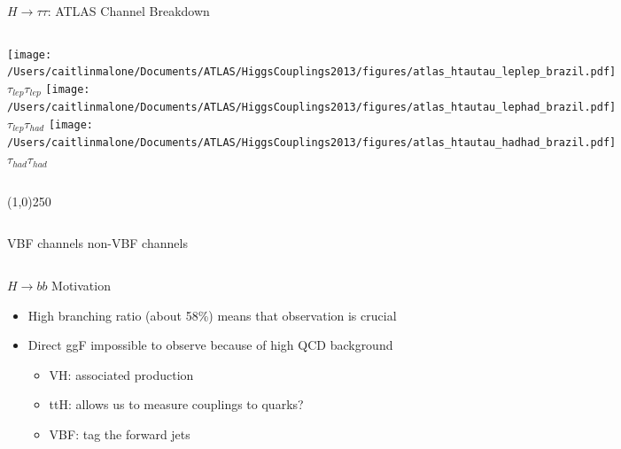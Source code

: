 \documentclass{beamer}
\begin{document}
\begin{frame}{$H\rightarrow\tau\tau$: ATLAS Channel Breakdown}
	\begin{columns}[c]
			\texttt{[image: /Users/caitlinmalone/Documents/ATLAS/HiggsCouplings2013/figures/atlas\_htautau\_leplep\_brazil.pdf]}\\
			\scriptsize\center \vspace{-0.5cm}
			$\tau_{lep}\tau_{lep}$
			\texttt{[image: /Users/caitlinmalone/Documents/ATLAS/HiggsCouplings2013/figures/atlas\_htautau\_lephad\_brazil.pdf]} 
			\scriptsize\center \vspace{-0.5cm}
			$\tau_{lep}\tau_{had}$
			\texttt{[image: /Users/caitlinmalone/Documents/ATLAS/HiggsCouplings2013/figures/atlas\_htautau\_hadhad\_brazil.pdf]} 
			\scriptsize \center \vspace{-0.5cm}
			$\tau_{had}\tau_{had}$
	\end{columns}
	
	\begin{center}
	\line(1,0){250}
	\end{center}
	
	\begin{columns}[c]
			\scriptsize \center \vspace{-0.5cm}
			VBF channels
			\scriptsize \center \vspace{-0.5cm}
			non-VBF channels
	\end{columns}

\end{frame}



\begin{frame}{$H\rightarrow bb$ Motivation}
	\begin{itemize}
		\item High branching ratio (about 58\%) means that observation is crucial 
		\item Direct ggF impossible to observe because of high QCD background
		\begin{itemize}
			\item VH: associated production
			\item ttH: allows us to measure couplings to quarks?
			\item VBF: tag the forward jets
		\end{itemize}
	\end{itemize}
\end{frame}
\end{document}
